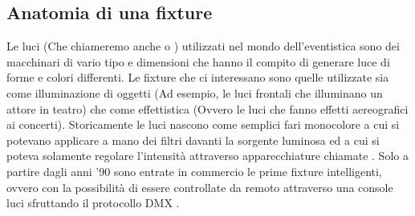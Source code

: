 \documentclass[main.tex]{subfiles}
\begin{document}
\subsection{Anatomia di una fixture}\label{subsec:1_fixtureAnatomy}
Le luci (Che chiameremo anche  o ) utilizzati nel mondo dell'eventistica sono dei macchinari di vario tipo e dimensioni che hanno il compito di generare luce di forme e colori differenti. Le fixture che ci interessano sono quelle utilizzate sia come illuminazione di oggetti (Ad esempio, le luci frontali che illuminano un attore in teatro) che come effettistica (Ovvero le luci che fanno effetti aereografici ai concerti). Storicamente le luci nascono come semplici fari monocolore a cui si potevano applicare a mano dei filtri davanti la sorgente luminosa ed a cui si poteva solamente regolare l'intensità attraverso apparecchiature chiamate . Solo a partire dagli anni '90 sono entrate in commercio le prime fixture intelligenti, ovvero con la possibilità di essere controllate da remoto attraverso una console luci sfruttando il protocollo DMX \cite{DMX}. 
\end{document}
